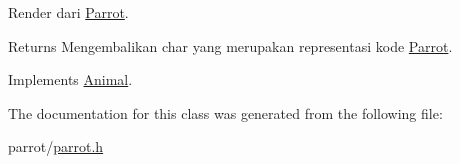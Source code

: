 Render dari \hyperlink{classParrot}{Parrot}. 

\begin{DoxyReturn}{Returns}
Mengembalikan char yang merupakan representasi kode \hyperlink{classParrot}{Parrot}. 
\end{DoxyReturn}


Implements \hyperlink{classAnimal_a43a47c0f41d211128e04abc6add53def}{Animal}.



The documentation for this class was generated from the following file\+:\begin{DoxyCompactItemize}
\item 
parrot/\hyperlink{parrot_8h}{parrot.\+h}\end{DoxyCompactItemize}
